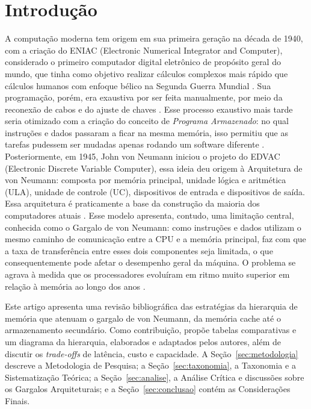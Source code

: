 \documentclass[12pt]{article}
\begin{document}
\section{Introdução} \label{sec:introducao}

A computação moderna tem origem em sua primeira geração na década de 1940, com a criação do ENIAC (Electronic Numerical Integrator and Computer), considerado o primeiro computador digital eletrônico de propósito geral do mundo, que tinha como objetivo realizar cálculos complexos  mais rápido que cálculos humanos com enfoque bélico na Segunda Guerra Mundial \cite{stallings2010}. Sua programação, porém, era exaustiva por ser feita manualmente, por meio da reconexão de cabos e do ajuste de chaves \cite{miletto2014}. Esse processo exaustivo mais tarde seria otimizado com a criação do conceito de \textit{Programa Armazenado}: no qual instruções e dados passaram a ficar na mesma memória, isso permitiu que as tarefas pudessem ser mudadas apenas rodando um software diferente \cite{stallings2010}. Posteriormente, em 1945, John von Neumann iniciou o projeto do EDVAC (Electronic Discrete Variable Computer), essa ideia deu origem à Arquitetura de von Neumann: composta por memória principal, unidade lógica e aritmética (ULA), unidade de controle (UC), dispositivos de entrada e dispositivos de saída. Essa arquitetura é praticamente a base da construção da maioria dos computadores atuais \cite{tanenbaum2013}. Esse modelo apresenta, contudo, uma limitação central,  conhecida como o Gargalo de von Neumann: como instruções e dados utilizam o mesmo caminho de comunicação entre a CPU e a memória principal, faz com que a taxa de transferência entre esses dois componentes seja limitada, o que consequentemente pode afetar o desempenho geral da máquina. O problema se agrava à medida que os processadores evoluíram em ritmo muito superior em relação à memória ao longo dos anos \cite{couto2017}.

Este artigo apresenta uma revisão bibliográfica das estratégias da
hierarquia de memória que atenuam o gargalo de von Neumann, da memória cache até o armazenamento secundário. Como contribuição,
propõe tabelas comparativas e um diagrama da hierarquia, elaborados e adaptados pelos
autores, além de discutir os \textit{trade-offs} de latência, custo e capacidade.
A Seção~\ref{sec:metodologia} descreve a Metodologia de Pesquisa; a
Seção~\ref{sec:taxonomia}, a Taxonomia e a Sistematização Teórica; a
Seção~\ref{sec:analise}, a Análise Crítica e discussões sobre os Gargalos Arquiteturais; e a Seção~\ref{sec:conclusao}
contém as Considerações Finais.
\end{document}
